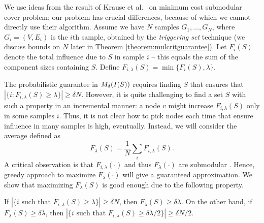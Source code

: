 We use ideas from the result of Krause et al.~\cite{krause:jmlr08} on minimum cost submodular cover problem; our problem has crucial differences, because of which we cannot directly use their algorithm. Assume we have $N$ samples $G_1,\ldots, G_N$, where $G_i=(V, E_i)$ is the $i$th sample, obtained by the \textit{triggering set} technique (we discuss bounds on $N$ later in Theorem \ref{theorem:mulcritguarantee}). Let $F_i(S)$ denote the total influence due to
$S$ in sample $i$ -- this equals the sum of the component sizes containing $S$. Define
$
F_{i, \lambda}(S) = \min\{F_i(S), \lambda\}.
$

The probabilistic guarantee in $\mbox{$M_{\delta}(I(S))$}$ requires finding $S$ that ensures that $|\{i: F_{i, \lambda}(S)\geq \lambda\}|\geq\delta N$. However, it is quite challenging to find a set $S$ with such a property in an incremental manner: a node $v$ might increase $F_{i, \lambda}(S)$ only in some samples $i$. Thus, it is not clear how to pick nodes each time that ensure influence in many samples is high, eventually. Instead, we will consider the average defined as
\[
F_{\lambda}(S) = \frac{1}{N}\sum_i F_{i, \lambda}(S).
\]
A critical observation is that $F_{i, \lambda}(\cdot)$ and thus $F_{\lambda}(\cdot)$ are submodular \cite{fujito2000approximation}.
Hence, greedy approach to maximize $F_{\lambda}(\cdot)$ will give a guaranteed approximation.
We show that maximizing $F_{\lambda}(S)$ is good enough due to the following property.

\begin{lemma}
\label{lemma:Flambda}
If $|\{i\mbox{ such that }F_{i,\lambda}(S)\geq \lambda\}|\geq \delta N$, then $F_{\lambda}(S)
\geq \delta\lambda$. On the other hand, if $F_{\lambda}(S)\geq \delta\lambda$, then
$|\{i\mbox{ such that }F_{i,\lambda}(S)\geq \delta\lambda/2\}|\geq \delta N/2$.
\end{lemma}

